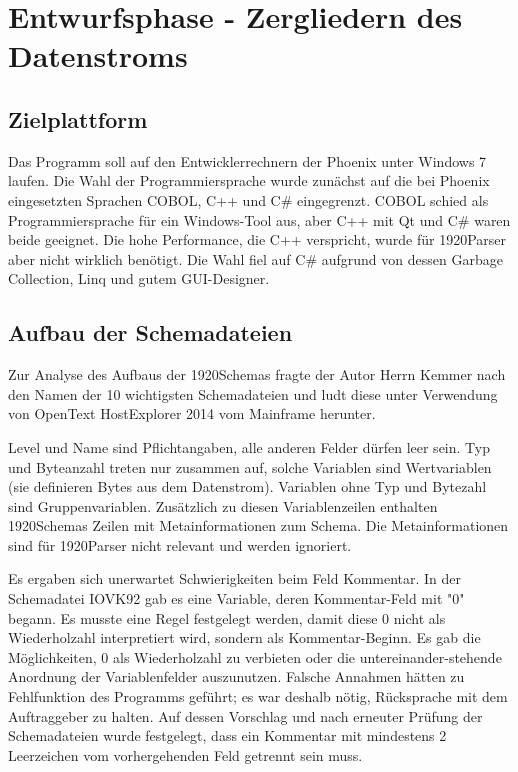 \section{Entwurfsphase - Zergliedern des Datenstroms} 
\label{sec:Entwurfsphase}

\subsection{Zielplattform}
\label{sec:Zielplattform}
Das Programm soll auf den Entwicklerrechnern der Phoenix unter Windows 7 laufen. 
Die Wahl der Programmiersprache wurde zunächst auf die bei Phoenix eingesetzten Sprachen COBOL, C++ und C\# eingegrenzt. COBOL schied als Programmiersprache für ein Windows-Tool aus,  aber C++ mit Qt und C\# waren beide geeignet. Die hohe Performance, die C++ verspricht, wurde für 1920Parser aber nicht wirklich benötigt. Die Wahl fiel auf C\# aufgrund von dessen Garbage Collection, Linq und gutem GUI-Designer.

\subsection{Aufbau der Schemadateien}
\label{sec:AufbauSchemas}
Zur Analyse des Aufbaus der 1920Schemas fragte der Autor Herrn Kemmer nach den Namen der 10 wichtigsten Schemadateien und ludt diese unter Verwendung von OpenText HostExplorer 2014 vom Mainframe herunter.

Level und Name sind Pflichtangaben, alle anderen Felder dürfen leer sein. Typ und Byteanzahl treten nur zusammen auf, solche Variablen sind Wertvariablen (sie definieren Bytes aus dem Datenstrom). Variablen ohne Typ und Bytezahl sind Gruppenvariablen.
Zusätzlich zu diesen Variablenzeilen enthalten 1920Schemas Zeilen mit Metainformationen zum Schema. Die Metainformationen sind für 1920Parser nicht relevant und werden ignoriert.

Es ergaben sich unerwartet Schwierigkeiten beim Feld Kommentar. In der Schemadatei IOVK92 gab es eine Variable, deren Kommentar-Feld mit "0" begann. Es musste eine Regel festgelegt werden, damit diese 0 nicht als Wiederholzahl interpretiert wird, sondern als Kommentar-Beginn. Es gab die Möglichkeiten, 0 als Wiederholzahl zu verbieten oder die untereinander-stehende Anordnung der Variablenfelder auszunutzen. Falsche Annahmen hätten zu Fehlfunktion des Programms geführt; es war deshalb nötig, Rücksprache mit dem Auftraggeber zu halten. Auf dessen Vorschlag und nach erneuter Prüfung der Schemadateien wurde festgelegt, dass ein Kommentar mit mindestens 2 Leerzeichen vom vorhergehenden Feld getrennt sein muss.

